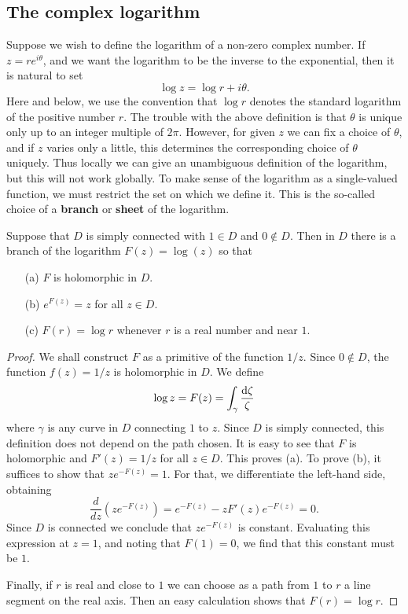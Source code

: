 \subsection{The complex logarithm}
Suppose we wish to define the logarithm of a non-zero complex number.
If $z=re^{i\theta}$, and we want the logarithm to be the inverse to the
exponential, then it is natural to set
\[\log z=\log r+i\theta.\]
Here and below, we use the convention that $\log r$ denotes the standard logarithm of the positive number $r$. The trouble with the above definition is that $\theta$ is unique only up to an integer multiple of $2\pi$. However, for given $z$ we can fix a choice of $\theta$, and if $z$ varies only a little, this determines the corresponding choice of $\theta$ uniquely. Thus locally we can give an unambiguous definition of the logarithm, but this will not work globally. To make sense of the logarithm as a single-valued function, we must restrict the set on which we define it. This is the so-called choice of a \textbf{branch} or \textbf{sheet} of the logarithm.\par
\begin{theorem}
Suppose that $D$ is simply connected with $1\in D$ and $0\notin D$. Then in $D$ there is a branch of the logarithm $F(z)=\log(z)$ so that
\begin{itemize}
\item[(a)] $F$ is holomorphic in $D$.
\item[(b)] $e^{F(z)}=z$ for all $z\in D$.
\item[(c)] $F(r)=\log r$ whenever $r$ is a real number and near $1$.
\end{itemize}
\end{theorem}
\begin{proof}
We shall construct $F$ as a primitive of the function $1/z$. Since $0\notin D$, the function $f(z)=1/z$ is holomorphic in $D$. We define
\[\log z=F(z)=\int_{\gamma}\frac{\mathop{}\!\mathrm{d}\zeta}{\zeta}\]
where $\gamma$ is any curve in $D$ connecting $1$ to $z$. Since $D$ is simply connected, this definition does not depend on the path chosen. It is easy to see that $F$ is holomorphic and $F'(z)=1/z$ for all $z\in D$. This proves (a). To prove (b), it suffices to show that $ze^{-F(z)}=1$. For that, we differentiate the left-hand side, obtaining
\[\frac{d}{dz}(ze^{-F(z)})=e^{-F(z)}-zF'(z)e^{-F(z)}=0.\]
Since $D$ is connected we conclude that $ze^{-F(z)}$ is constant. Evaluating this expression at $z=1$, and noting that $F(1)=0$, we find that this constant must be $1$.\par
Finally, if $r$ is real and close to $1$ we can choose as a path from $1$ to $r$ a line segment on the real axis. Then an easy calculation shows that $F(r)=\log r$.
\end{proof}
